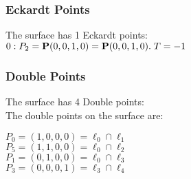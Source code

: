 \documentclass{article}
\newcommand{\bP}{{\bf P}}
\begin{document}
{\subsubsection*{Eckardt Points}
The surface has 1 Eckardt points:\\
$0 : P_{2}=\bP(0, 0, 1, 0) = \bP(0, 0, 1, 0).\; T= -1$\\
\subsubsection*{Double Points}
The surface has 4 Double points:\\
The double points on the surface are:\\
\begin{multicols}{2}
\noindent
$P_{0} = ( 1, 0, 0, 0 ) = \ell_{0} \cap \ell_{1} $\\
$P_{5} = ( 1, 1, 0, 0 ) = \ell_{0} \cap \ell_{2} $\\
$P_{1} = ( 0, 1, 0, 0 ) = \ell_{0} \cap \ell_{3} $\\
$P_{3} = ( 0, 0, 0, 1 ) = \ell_{3} \cap \ell_{4} $\\
\end{multicols}
}
\end{document}
